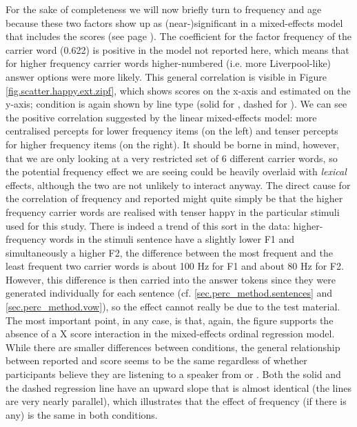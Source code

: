 For the sake of completeness we will now briefly turn to frequency and age because these two factors show up as (near-)significant in a mixed-effects model that includes the  scores (see page \pageref{sec.perc_res.happy}).
The coefficient for the factor frequency of the carrier word (0.622) is positive in the model not reported here, which means that for higher frequency carrier words higher-numbered (i.e. more Liverpool-like) answer options were more likely.
This general correlation is visible in Figure \ref{fig.scatter.happy.ext.zipf}, which shows  scores on the x-axis and estimated  on the y-axis;  condition is again shown by line type (solid for , dashed for ).
We can see the positive correlation suggested by the linear mixed-effects model: more centralised percepts for lower frequency items (on the left) and tenser percepts for higher frequency items (on the right).
It should be borne in mind, however, that we are only looking at a very restricted set of 6 different carrier words, so the potential frequency effect we are seeing could be heavily overlaid with \emph{lexical} effects, although the two are not unlikely to interact anyway.
The direct cause for the correlation of frequency and reported  might quite simply be that the higher frequency carrier words are realised with tenser happ\textsc{y} in the particular stimuli used for this study.
There is indeed a trend of this sort in the data: higher-frequency words in the stimuli sentence have a slightly lower F1 and simultaneously a higher F2, the difference between the most frequent and the least frequent two carrier words is about 100 Hz for F1 and about 80 Hz for F2.
However, this difference is then carried into the answer tokens since they were generated individually for each sentence (cf. \ref{sec.perc_method.sentences} and \ref{sec.perc_method.vow}), so the effect cannot really be due to the test material.
The most important point, in any case, is that, again, the figure supports the absence of a  X  score interaction in the mixed-effects ordinal regression model.
While there are smaller differences between  conditions, the general relationship between reported  and  score seems to be the same regardless of whether participants believe they are listening to a speaker from  or .
Both the solid and the dashed regression line have an upward slope that is almost identical (the lines are very nearly parallel), which illustrates that the effect of frequency (if there is any) is the same in both  conditions.

